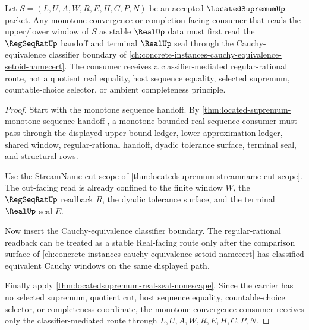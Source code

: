 \begin{theorem}
\label{thm:located-supremum-monotone-convergence-consumer-envelope}
Let $S=(L,U,A,W,R,E,H,C,P,N)$ be an accepted $\LocatedSupremumUp$ packet. Any monotone-convergence or completion-facing consumer that reads the upper/lower window of $S$ as stable $\RealUp$ data must first read the $\RegSeqRatUp$ handoff and terminal $\RealUp$ seal through the Cauchy-equivalence classifier boundary of \autoref{ch:concrete-instances-cauchy-equivalence-setoid-namecert}. The consumer receives a classifier-mediated regular-rational route, not a quotient real equality, host sequence equality, selected supremum, countable-choice selector, or ambient completeness principle.
\end{theorem}
\begin{proof}
Start with the monotone sequence handoff. By \autoref{thm:located-supremum-monotone-sequence-handoff}, a monotone bounded real-sequence consumer must pass through the displayed upper-bound ledger, lower-approximation ledger, shared window, regular-rational handoff, dyadic tolerance surface, terminal seal, and structural rows.

Use the StreamName cut scope of \autoref{thm:locatedsupremum-streamname-cut-scope}. The cut-facing read is already confined to the finite window $W$, the $\RegSeqRatUp$ readback $R$, the dyadic tolerance surface, and the terminal $\RealUp$ seal $E$.

Now insert the Cauchy-equivalence classifier boundary. The regular-rational readback can be treated as a stable Real-facing route only after the comparison surface of \autoref{ch:concrete-instances-cauchy-equivalence-setoid-namecert} has classified equivalent Cauchy windows on the same displayed path.

Finally apply \autoref{thm:locatedsupremum-real-seal-nonescape}. Since the carrier has no selected supremum, quotient cut, host sequence equality, countable-choice selector, or completeness coordinate, the monotone-convergence consumer receives only the classifier-mediated route through $L,U,A,W,R,E,H,C,P,N$.
\end{proof}


